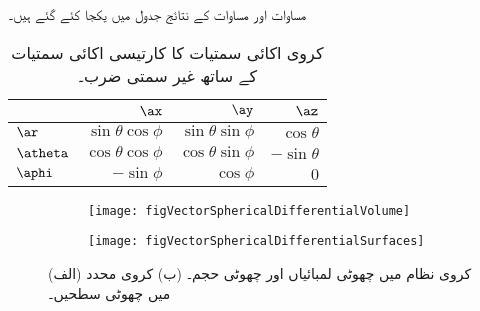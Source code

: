 مساوات   اور مساوات   کے نتائج جدول  میں یکجا کئے گئے ہیں۔ 
\begin{table}
\caption{کروی  اکائی سمتیات کا کارتیسی اکائی سمتیات کے ساتھ غیر سمتی ضرب۔}
\centering
\begin{tabular}{l | r r r}
 & $\ax$ & $\ay$ & $\az$ \\
\hline
$\ar$ & $\sin \theta \cos \phi$ & $\sin \theta \sin \phi$& $\cos \theta$\\
$\atheta$ &$\cos \theta \cos \phi$ &$ \cos \theta \sin \phi$ &$ -\sin \theta$\\
$\aphi$ & $-\sin \phi$ &$ \cos \phi$ &$0$
\end{tabular}
\label{جدول_سمتیہ_کروی_کارتیسی_اکائی_غیر-سمتی_ضرب}
\end{table}
%
\begin{figure}
\centering
\begin{subfigure}{0.5\textwidth}
\centering
\texttt{[image: figVectorSphericalDifferentialVolume]}
\end{subfigure}%
%
\begin{subfigure}{0.5\textwidth}
\centering
\texttt{[image: figVectorSphericalDifferentialSurfaces]}
\end{subfigure}%
\caption{(الف) کروی نظام میں  چھوٹی لمبائیاں اور چھوٹی حجم۔ (ب) کروی محدد میں چھوٹی سطحیں۔}
\label{شکل_سمتیہ_کروی_چھوٹی_حجم}
\end{figure}

